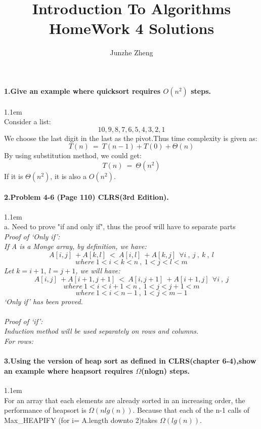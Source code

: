 \documentclass[11pt]{article}
\title{Introduction To Algorithms \\ HomeWork 4 Solutions}
\author{Junzhe Zheng}
\begin{document}
\maketitle

\paragraph{1.Give an example where quicksort requires $O(n^{2})$ steps.}
\hangindent 1.1em
\noindent
\\Consider a list:
\[
	10,9,8,7,6,5,4,3,2,1
\]
We choose the last digit in the last as the pivot.Thus time complexity is given as:
\[
	T(n)\ =\ T(n-1)+T(0)+\Theta(n)
\]
By using substitution method, we could get:
\[
	T(n)\ =\ \Theta(n^{2})
\]
If it is $\Theta(n^{2})$, it is also a $O(n^{2})$.
\\
\paragraph{2.Problem 4-6 (Page 110) CLRS(3rd Edition).}
\hangindent 1.1em
\noindent
\\a. Need to prove "if and only if", thus the proof will have to separate parts
\\\it{ Proof of `Only if'}\normalfont:
\\If A is a Monge array, by definition, we have:
$$A[i,j]\ +A[k,l]\ <\ A[i,l]\ +A[k,j]\ \ \forall i\ ,\ j\ ,\ k\ ,\ l$$
$$where\ 1<i<k<n\ ,\ 1<j<l<m$$
Let $k=i+1,\ l=j+1$, we will have:
$$A[i,j]\ +A[i+1,j+1]\ <\ A[i,j+1]\ +A[i+1,j]\ \ \forall i\ ,\ j$$
$$where\ 1<i<i+1<n\ ,\ 1<j<j+1<m$$
$$where\ 1<i<n-1\ ,\ 1<j<m-1$$
`Only if' has been proved.
\\
\\\it{Proof of `if'}\normalfont:
\\Induction method will be used separately on rows and columns.
\\For rows:
\\
\paragraph{3.Using the version of heap sort as defined in CLRS(chapter 6-4),show an example where heapsort requires $\Omega$(nlogn) steps. }
\hangindent 1.1em
\noindent
\\For an array that each elements are already sorted in an increasing order, the performance of heapsort is $\Omega (nlg(n))$. Because that each of the n-1 calls of Max\_HEAPIFY (for i= A.length downto 2)takes $\Omega (lg(n))$.
\\
\end{document}
